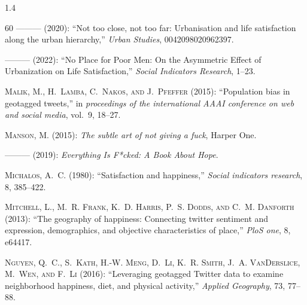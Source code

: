 \documentclass[10pt, letterpaper]{article}
\begin{document}
\begin{spacing}{1.4}
\begin{thebibliography}{60}
---\hspace{-.1pt}---\hspace{-.1pt}--- (2020): \enquote{Not too close, not too
  far: Urbanisation and life satisfaction along the urban hierarchy,}
  \emph{Urban Studies}, 0042098020962397.

---\hspace{-.1pt}---\hspace{-.1pt}--- (2022): \enquote{No Place for Poor Men:
  On the Asymmetric Effect of Urbanization on Life Satisfaction,} \emph{Social
  Indicators Research}, 1--23.

\textsc{Malik, M., H.~Lamba, C.~Nakos, and J.~Pfeffer} (2015):
  \enquote{Population bias in geotagged tweets,} in \emph{proceedings of the
  international AAAI conference on web and social media}, vol.~9, 18--27.

\textsc{Manson, M.} (2015): \emph{The subtle art of not giving a fuck}, Harper
  One.

---\hspace{-.1pt}---\hspace{-.1pt}--- (2019): \emph{Everything Is F*cked: A
  Book About Hope}.

\textsc{Michalos, A.~C.} (1980): \enquote{Satisfaction and happiness,}
  \emph{Social indicators research}, 8, 385--422.

\textsc{Mitchell, L., M.~R. Frank, K.~D. Harris, P.~S. Dodds, and C.~M.
  Danforth} (2013): \enquote{The geography of happiness: Connecting twitter
  sentiment and expression, demographics, and objective characteristics of
  place,} \emph{PloS one}, 8, e64417.

\textsc{Nguyen, Q.~C., S.~Kath, H.-W. Meng, D.~Li, K.~R. Smith, J.~A.
  VanDerslice, M.~Wen, and F.~Li} (2016): \enquote{Leveraging geotagged Twitter
  data to examine neighborhood happiness, diet, and physical activity,}
  \emph{Applied Geography}, 73, 77--88.


\end{thebibliography}
\end{spacing}
\end{document}

